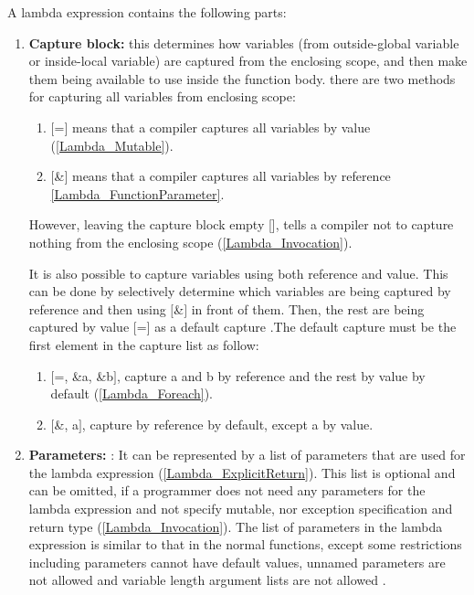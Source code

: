 \documentclass[11pt]{report}
\begin{document}
A lambda expression contains the following parts:
\begin{enumerate}
\item \textbf{Capture block:} this determines how variables (from outside-global variable or inside-local variable) are captured from the enclosing scope, and then make them being available to use inside the function body. there are two methods for capturing all variables from enclosing scope:

      \begin{enumerate}
      \item $[$=$]$ means that a compiler captures all variables by value (\ref{Lambda_Mutable}).
      \item $[$\&$]$ means that a compiler captures all variables by reference 
             \ref{Lambda_FunctionParameter}.
      \end{enumerate}
      However, leaving the capture block empty [], tells a compiler not to capture nothing from the enclosing scope (\ref{Lambda_Invocation}).
      
      It is also possible to capture variables using both reference and value. This can be done by selectively determine which variables are being captured by reference and then using $[$\&$]$ in front of them. Then, the rest are being captured by value $[$=$]$ as a default capture \cite{Gregorie:professionalcpp}.The default capture must be the first element in the capture list as follow:
      \begin{enumerate}
      \item $[$=, \&a, \&b$]$, capture a and b by reference and the rest by value by default (\ref{Lambda_Foreach}).
      \item $[$\&, a$]$, capture by reference by default, except a by value.
      \end{enumerate}
      
      
\item \textbf{Parameters:} : It can be represented by a list of parameters that are used for the lambda expression (\ref{Lambda_ExplicitReturn}). This list is optional and can be omitted, if a programmer does not need any parameters for the lambda expression and not specify mutable, nor exception specification and return type (\ref{Lambda_Invocation}). The list of parameters in the lambda expression is similar to that in the normal functions, except some restrictions including parameters cannot have default values, unnamed parameters are not allowed and variable length argument lists are not allowed \cite{Cppreference:2012:Cpp11}.


\end{enumerate}
\end{document}
